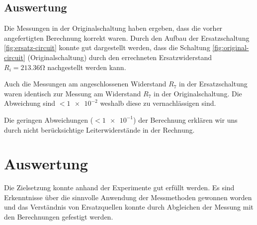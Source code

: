 \documentclass[a4paper, 11pt]{report}
\begin{document}
\section{Auswertung}

Die Messungen in der Originalschaltung haben ergeben, dass die vorher angefertigten Berechnung korrekt waren.
Durch den Aufbau der Ersatzschaltung \ref{fig:ersatz-circuit} konnte gut dargestellt werden, dass die Schaltung \ref{fig:original-circuit} (Originalschaltung) durch den errechneten Ersatzwiderstand \(R_i = 213.36\si{\ohm}\) nachgestellt werden kann.

Auch die Messungen am angeschlossenen Widerstand \(R_7\) in der Ersatzschaltung waren identisch zur Messung am Widerstand \(R_7\) in der Originalschaltung.
Die Abweichung sind \(<\num{1e-2}\) weshalb diese zu vernachlässigen sind.

Die geringen Abweichungen (\(<\num{1e-1}\)) der Berechnung erklären wir uns durch nicht berücksichtige Leiterwiderstände in der Rechnung.

\chapter{Auswertung}

Die Zielsetzung konnte anhand der Experimente gut erfüllt werden.
Es sind Erkenntnisse über die sinnvolle Anwendung der Messmethoden gewonnen worden und das Verständnis von Ersatzquellen konnte durch Abgleichen der Messung mit den Berechnungen gefestigt werden.
\end{document}
